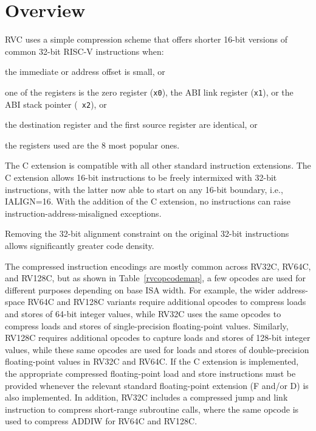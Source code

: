 \section{Overview}

RVC uses a simple compression scheme that offers shorter 16-bit
versions of common 32-bit RISC-V instructions when:
\begin{tightlist}
	\item the immediate or address offset is small, or
	\item one of the registers is the zero register ({\tt x0}), the
      ABI link register ({\tt x1}), or the ABI stack pointer ({\tt
        x2}), or
	\item the destination register and the first source register are
      identical, or   
	\item the registers used are the 8 most popular ones. 
\end{tightlist}

The C extension is compatible with all other standard instruction
extensions.  The C extension allows 16-bit instructions to be freely
intermixed with 32-bit instructions, with the latter now able to start
on any 16-bit boundary, i.e., IALIGN=16.  With the addition of the C
extension, no instructions can raise instruction-address-misaligned
exceptions.

\begin{commentary}
Removing the 32-bit alignment constraint on the original 32-bit
instructions allows significantly greater code density.
\end{commentary}

The compressed instruction encodings are mostly common across RV32C,
RV64C, and RV128C, but as shown in Table~\ref{rvcopcodemap}, a few
opcodes are used for different purposes depending on base ISA width.
For example, the wider address-space RV64C and RV128C variants require
additional opcodes to compress loads and stores of 64-bit integer
values, while RV32C uses the same opcodes to compress loads and stores
of single-precision floating-point values.  Similarly, RV128C requires
additional opcodes to capture loads and stores of 128-bit integer
values, while these same opcodes are used for loads and stores of
double-precision floating-point values in RV32C and RV64C.  If the C
extension is implemented, the appropriate compressed floating-point
load and store instructions must be provided whenever the relevant
standard floating-point extension (F and/or D) is also implemented.
In addition, RV32C includes a compressed jump and link instruction to
compress short-range subroutine calls, where the same opcode is used
to compress ADDIW for RV64C and RV128C.

